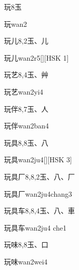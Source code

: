 \begin{entry}{玩}{8}{⽟}
  \begin{phonetics}{玩}{wan2}
  \end{phonetics}
\end{entry}

\begin{entry}{玩儿}{8,2}{⽟、⼉}
  \begin{phonetics}{玩儿}{wan2r5}[][HSK 1]
  \end{phonetics}
\end{entry}

\begin{entry}{玩艺}{8,4}{⽟、⾋}
  \begin{phonetics}{玩艺}{wan2yi4}
  \end{phonetics}
\end{entry}

\begin{entry}{玩伴}{8,7}{⽟、⼈}
  \begin{phonetics}{玩伴}{wan2ban4}
  \end{phonetics}
\end{entry}

\begin{entry}{玩具}{8,8}{⽟、⼋}
  \begin{phonetics}{玩具}{wan2ju4}[][HSK 3]
  \end{phonetics}
\end{entry}

\begin{entry}{玩具厂}{8,8,2}{⽟、⼋、⼚}
  \begin{phonetics}{玩具厂}{wan2ju4chang3}
  \end{phonetics}
\end{entry}

\begin{entry}{玩具车}{8,8,4}{⽟、⼋、⾞}
  \begin{phonetics}{玩具车}{wan2ju4 che1}
  \end{phonetics}
\end{entry}

\begin{entry}{玩味}{8,8}{⽟、⼝}
  \begin{phonetics}{玩味}{wan2wei4}
  \end{phonetics}
\end{entry}

